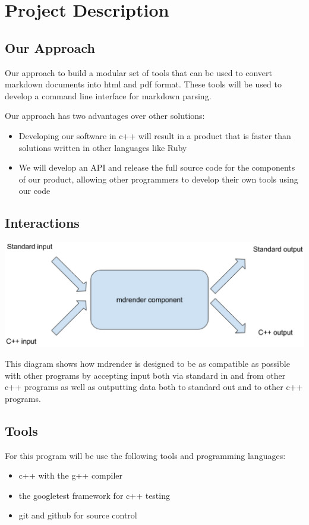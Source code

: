 \section{Project Description}

\subsection{Our Approach}
Our approach to build a modular set of tools that can be used to convert markdown documents into html and pdf format. These tools will be used to develop a command line interface for markdown parsing.

Our approach has two advantages over other solutions:
\begin{itemize}
	\item Developing our software in c++ will result in a product that is faster than solutions written in other languages like Ruby
	\item We will develop an API and release the full source code for the components of our product, allowing other programmers to develop their own tools using our code
\end{itemize}

\subsection{Interactions}

\includegraphics[width=500pt]{images/mdrender_interactions.eps}

This diagram shows how mdrender is designed to be as compatible as possible with other programs by accepting input both via standard in and from other c++ programs as well as outputting data both to standard out and to other c++ programs.

\subsection{Tools}
For this program will be use the following tools and programming languages:
\begin{itemize}
	\item c++ with the g++ compiler
	\item the googletest framework for c++ testing
	\item git and github for source control
\end{itemize}

